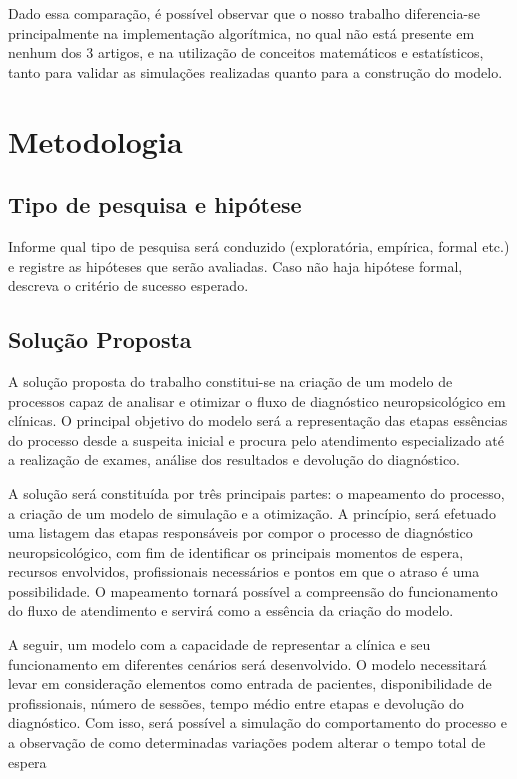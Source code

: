 \documentclass[
    12pt,
    openright,
    oneside,
    a4paper,
    english,
    brazil
]{abntex2}
\begin{document}
Dado essa comparação, é possível observar que o nosso trabalho diferencia-se principalmente na implementação algorítmica, no qual não está presente em nenhum dos 3 artigos, e na utilização de conceitos matemáticos e estatísticos, tanto para validar as simulações realizadas quanto para a construção do modelo.


\chapter{Metodologia}

\section{Tipo de pesquisa e hipótese}
Informe qual tipo de pesquisa será conduzido (exploratória, empírica, formal etc.) e registre as hipóteses que serão avaliadas. Caso não haja hipótese formal, descreva o critério de sucesso esperado.

\section{Solução Proposta}

A solução proposta do trabalho constitui-se na criação de um modelo de processos capaz de analisar e otimizar o fluxo de diagnóstico neuropsicológico em clínicas. O principal objetivo do modelo será a representação das etapas essências do processo desde a suspeita inicial e procura pelo atendimento especializado até a realização de exames, análise dos resultados e devolução do diagnóstico. 

A solução será constituída por três principais partes: o mapeamento do processo, a criação de um modelo de simulação e a otimização. A princípio, será efetuado uma listagem das etapas responsáveis por compor o processo de diagnóstico neuropsicológico, com fim de identificar os principais momentos de espera, recursos envolvidos, profissionais necessários e pontos em que o atraso é uma possibilidade. O mapeamento tornará possível a compreensão do funcionamento do fluxo de atendimento e servirá como a essência da criação do modelo.

A seguir, um modelo com a capacidade de representar a clínica e seu funcionamento em diferentes cenários será desenvolvido. O modelo necessitará levar em consideração elementos como entrada de pacientes, disponibilidade de profissionais, número de sessões, tempo médio entre etapas e devolução do diagnóstico. Com isso, será possível a simulação do comportamento do processo e a observação de como determinadas variações podem alterar o tempo total de espera
\end{document}
